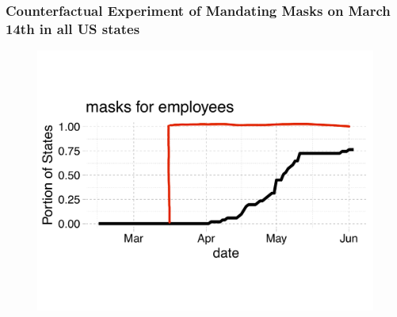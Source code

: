 \documentclass{beamer}
\begin{document}

\begin{frame}
  \frametitle{Counterfactual Experiment of Mandating Masks on March 14th in all US states}

\vspace{-0.5cm}

\begin{figure}[ht]%
      \includegraphics[width=\textwidth]{pmaskbus_p_experiment2}  
\end{figure}


\end{frame}
\end{document}
